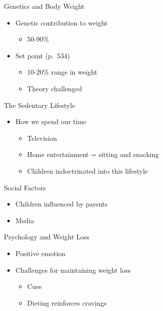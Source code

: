 \documentclass[
]{book}
\providecommand{\tightlist}{%
  \setlength{\itemsep}{0pt}\setlength{\parskip}{0pt}}
\begin{document}
\begin{reflect}
Genetics and Body Weight

\begin{itemize}
\tightlist
\item
  Genetic contribution to weight

  \begin{itemize}
  \tightlist
  \item
    50-90\%\\
  \end{itemize}
\item
  Set point (p.~534)

  \begin{itemize}
  \tightlist
  \item
    10-20\% range in weight\\
  \item
    Theory challenged
  \end{itemize}
\end{itemize}

The Sedentary Lifestyle

\begin{itemize}
\tightlist
\item
  How we spend our time

  \begin{itemize}
  \tightlist
  \item
    Television\\
  \item
    Home entertainment = sitting and snacking\\
  \item
    Children indoctrinated into this lifestyle
  \end{itemize}
\end{itemize}

Social Factors

\begin{itemize}
\tightlist
\item
  Children influenced by parents\\
\item
  Media
\end{itemize}

Psychology and Weight Loss

\begin{itemize}
\tightlist
\item
  Positive emotion\\
\item
  Challenges for maintaining weight loss

  \begin{itemize}
  \tightlist
  \item
    Cues\\
  \item
    Dieting reinforces cravings
  \end{itemize}
\end{itemize}


\end{reflect}
\end{document}
